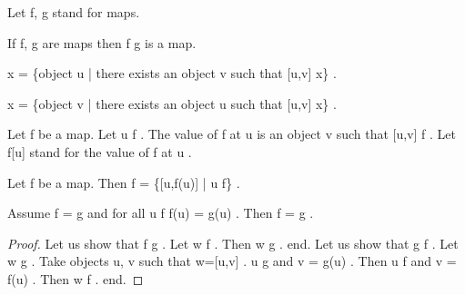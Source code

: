 \documentclass[a4paper,draft]{amsproc}
\begin{document}
\begin{forthel}
Let  f, g  stand for maps.

\begin{theorem}
If  f, g  are maps then  f \circ g  is a map.
\end{theorem}

\begin{definition}
 \domain x = \{object u |   there exists an object  v  such that  [u,v] \in x\} .
\end{definition}

\begin{definition}
 \range x = \{object v |   there exists an object  u  such that  [u,v] \in x\} .
\end{definition}


\begin{signature}
Let  f  be a map. Let  u \in \domain f .
The value of  f  at  u  is an object  v  such that  [u,v] \in f .
Let  f[u]  stand for the value of  f  at  u .
\end{signature}


\begin{theorem}
Let  f  be a map. Then  f = \{[u,f(u)] | u \in \domain f\} .
\end{theorem}

\begin{theorem}
Assume  \domain f = \domain g  and for all  u \in \domain f f(u) = g(u) . Then  f = g .
\end{theorem}
\begin{proof}
Let us show that  f \subset g .
Let  w \in f . 
Then  w \in g . end.
Let us show that  g \subset f .
Let  w \in g .  
Take objects  u, v  such that  w=[u,v] .
 u \in \domain g  and  v = g(u) .
Then  u \in \domain f  and  v = f(u) .
Then  w \in f . end.
\end{proof}


\end{forthel}
\end{document}
